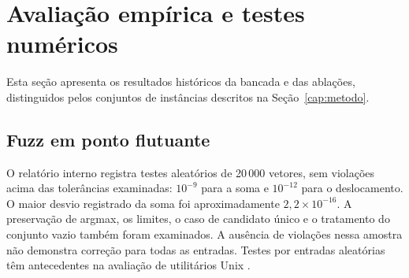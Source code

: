 \documentclass[12pt,openany,oneside,a4paper,brazil,chapter=TITLE]{abntex2}
\let\cite\citep
\begin{document}


\chapter{Avaliação empírica e testes numéricos}\label{cap:resultados}
Esta seção apresenta os resultados históricos da bancada e das ablações, distinguidos pelos conjuntos de instâncias descritos na Seção~\ref{cap:metodo}.
\section{Fuzz em ponto flutuante}
O relatório interno registra testes aleatórios de 20\,000 vetores, sem violações acima das tolerâncias examinadas: $10^{-9}$ para a soma e $10^{-12}$ para o deslocamento. O maior desvio registrado da soma foi aproximadamente $2{,}2\times10^{-16}$. A preservação de argmax, os limites, o caso de candidato único e o tratamento do conjunto vazio também foram examinados. A ausência de violações nessa amostra não demonstra correção para todas as entradas. Testes por entradas aleatórias têm antecedentes na avaliação de utilitários Unix \cite{miller1990}.
\end{document}
